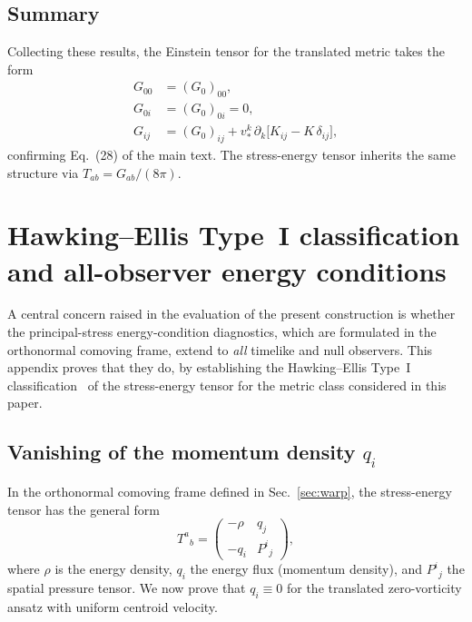 \documentclass[11pt]{article}
\begin{document}
\subsection{Summary}
Collecting these results, the Einstein tensor for the translated metric takes the form
\begin{align}
G_{00} &= (G_0)_{00}, \\
G_{0i} &= (G_0)_{0i} = 0, \\
G_{ij} &= (G_0)_{ij} + v_*^k\,\partial_k\bigl[K_{ij} - K\,\delta_{ij}\bigr],
\end{align}
confirming Eq.~(28) of the main text. The stress-energy tensor inherits the same structure via $T_{ab} = G_{ab}/(8\pi)$.


\section{Hawking--Ellis Type~I classification and all-observer energy conditions}
\label{app:type1}
\label{app:qi-vanishes}

A central concern raised in the evaluation of the present construction is whether the principal-stress energy-condition diagnostics, which are formulated in the orthonormal comoving frame, extend to \emph{all} timelike and null observers. This appendix proves that they do, by establishing the Hawking--Ellis Type~I classification~\cite{HawkingEllis1973} of the stress-energy tensor for the metric class considered in this paper.

\subsection{Vanishing of the momentum density \texorpdfstring{$q_i$}{qi}}

In the orthonormal comoving frame defined in Sec.~\ref{sec:warp}, the stress-energy tensor has the general form
\begin{equation}
T^a{}_b = \begin{pmatrix} -\rho & q_j \\ -q_i & P^i{}_j \end{pmatrix},
\end{equation}
where $\rho$ is the energy density, $q_i$ the energy flux (momentum density), and $P^i{}_j$ the spatial pressure tensor. We now prove that $q_i \equiv 0$ for the translated zero-vorticity ansatz with uniform centroid velocity.
\end{document}
